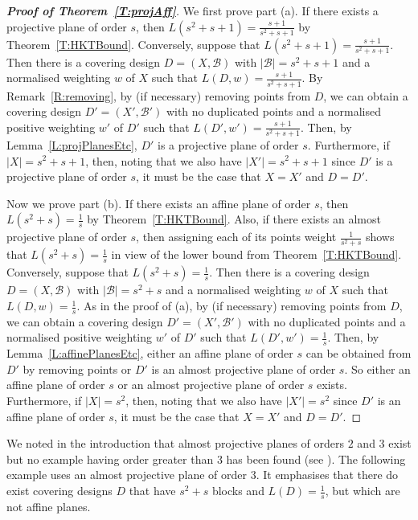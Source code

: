 \documentclass[11pt]{article}
\theoremstyle{definition}
\newcommand{\B}{{\ensuremath{\mathcal{B}}}}
\begin{document}
\begin{proof}[\textup{\textbf{Proof of Theorem~\ref{T:projAff}}}]
We first prove part (a). If there exists a projective plane of order $s$, then $L(s^2+s+1)=\frac{s+1}{s^2+s+1}$ by Theorem~\ref{T:HKTBound}. Conversely, suppose that $L(s^2+s+1)=\frac{s+1}{s^2+s+1}$. Then there is a covering design $D=(X,\B)$ with $|\B|=s^2+s+1$ and a normalised weighting $w$ of $X$ such that $L(D,w)=\frac{s+1}{s^2+s+1}$. By Remark~\ref{R:removing}, by (if necessary) removing points from $D$, we can obtain a covering design $D'=(X',\B')$ with no duplicated points and a normalised positive weighting $w'$ of $D'$ such that $L(D',w')=\frac{s+1}{s^2+s+1}$. Then, by Lemma~\ref{L:projPlanesEtc}, $D'$ is a projective plane of order $s$. Furthermore, if $|X|=s^2+s+1$, then, noting that we also have $|X'|=s^2+s+1$ since $D'$ is a projective plane of order $s$, it must be the case that $X=X'$ and $D=D'$.

Now we prove part (b). If there exists an affine plane of order $s$, then $L(s^2+s)=\frac{1}{s}$ by Theorem~\ref{T:HKTBound}. Also, if there exists an almost projective plane of order $s$, then assigning each of its points weight $\frac{1}{s^2+s}$ shows that $L(s^2+s)=\frac{1}{s}$ in view of the lower bound from Theorem~\ref{T:HKTBound}. Conversely, suppose that $L(s^2+s)=\frac{1}{s}$. Then there is a covering design $D=(X,\B)$ with $|\B|=s^2+s$ and a normalised weighting $w$ of $X$ such that $L(D,w)=\frac{1}{s}$. As in the proof of (a), by (if necessary) removing points from $D$, we can obtain a covering design $D'=(X',\B')$ with no duplicated points and a normalised positive weighting $w'$ of $D'$ such that $L(D',w')=\frac{1}{s}$. Then, by Lemma~\ref{L:affinePlanesEtc}, either an affine plane of order $s$ can be obtained from $D'$ by removing points or $D'$ is an almost projective plane of order $s$. So either an affine plane of order $s$ or an almost projective plane of order $s$ exists. Furthermore, if $|X|=s^2$, then, noting that we also have $|X'|=s^2$ since $D'$ is an affine plane of order $s$, it must be the case that $X=X'$ and $D=D'$.
\end{proof}

We noted in the introduction that almost projective planes of orders $2$ and $3$ exist but no example having order greater than 3 has been found (see \cite{BieMarPam,BloJunSch}). The following example uses an almost projective plane of order $3$. It emphasises that there do exist covering designs $D$ that have $s^2+s$ blocks and $L(D)=\frac{1}{s}$, but which are not affine planes.
\end{document}
